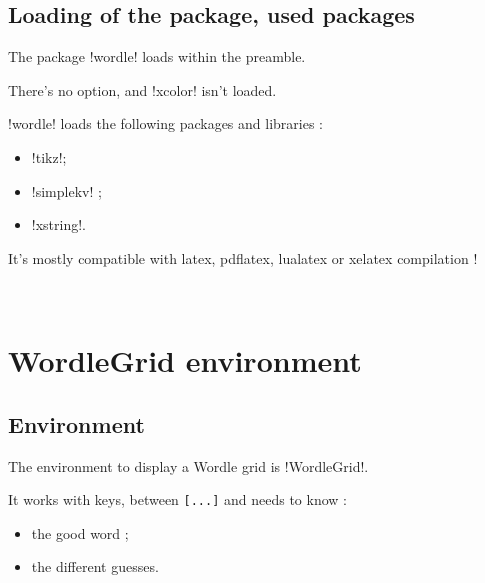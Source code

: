 \documentclass[english,a4paper,11pt]{article}
\begin{document}
{\subsection{Loading of the package, used packages}

\begin{importantblock}
The package \packagetex!wordle! loads within the preamble.

There's no option, and \packagetex!xcolor! isn't loaded.
\end{importantblock}


\begin{noteblock}
\packagetex!wordle! loads the following packages and libraries :

\begin{itemize}
	\item \packagetex!tikz!;
	\item \packagetex!simplekv! ;
	\item \packagetex!xstring!.
\end{itemize}

It’s mostly compatible with \textsf{latex}, \textsf{pdflatex}, \textsf{lualatex} or \textsf{xelatex} compilation !
\end{noteblock}

\vfill~

\pagebreak

\section{WordleGrid environment}

\subsection{Environment}

\begin{cautionblock}
The environment to display a Wordle grid is \packagetex!WordleGrid!.

It works with keys, between \texttt{[...]} and needs to know :

\begin{itemize}
	\item the good word ;
	\item the different guesses.
\end{itemize}


\end{cautionblock}}
\end{document}
